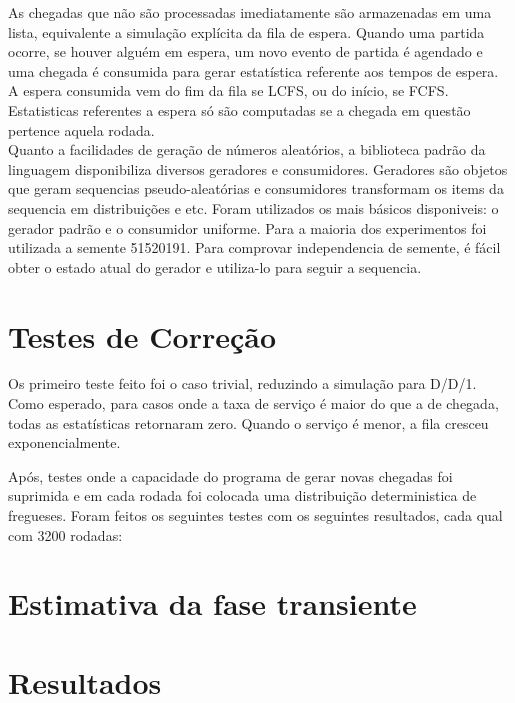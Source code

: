 \documentclass{article}
\begin{document}
As chegadas que não são processadas imediatamente são armazenadas em uma lista, equivalente a simulação explícita da fila de espera. Quando uma partida ocorre, se houver alguém em espera, um novo evento de partida é agendado e uma chegada é consumida para gerar estatística referente aos tempos de espera. A espera consumida vem do fim da fila se LCFS, ou do início, se FCFS. Estatisticas referentes a espera só são computadas se a chegada em questão pertence aquela rodada. \\

Quanto a facilidades de geração de números aleatórios, a biblioteca padrão da linguagem disponibiliza diversos geradores e consumidores. Geradores são objetos que geram sequencias pseudo-aleatórias e consumidores transformam os items da sequencia em distribuições e etc. Foram utilizados os mais básicos disponiveis: o gerador padrão e o consumidor uniforme. Para a maioria dos experimentos foi utilizada a semente 51520191. Para comprovar independencia de semente, é fácil obter o estado atual do gerador e utiliza-lo para seguir a sequencia.

\section{Testes de Correção}
Os primeiro teste feito foi o caso trivial, reduzindo a simulação para D/D/1. Como esperado, para casos onde a taxa de serviço é maior do que a de chegada, todas as estatísticas retornaram zero. Quando o serviço é menor, a fila cresceu exponencialmente.

Após, testes onde a capacidade do programa de gerar novas chegadas foi suprimida e em cada rodada foi colocada uma distribuição deterministica de fregueses. Foram feitos os seguintes testes com os seguintes resultados, cada qual com 3200 rodadas:

\begin{itemize}

\end{itemize}



\section{Estimativa da fase transiente}

\section{Resultados}
\end{document}

